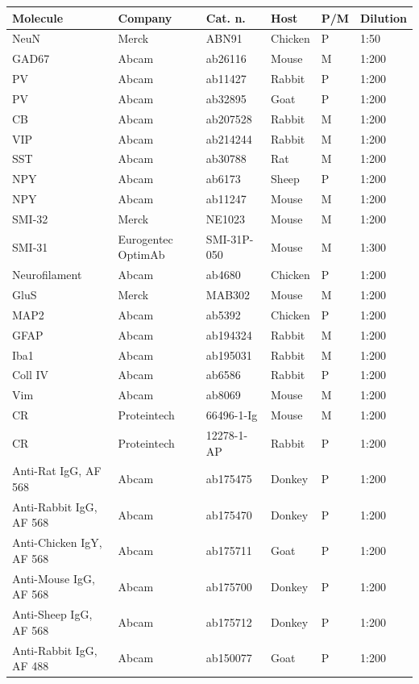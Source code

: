 \documentclass{article}
\begin{document}
\begin{center}\small\begin{longtable}{llllll}\toprule
\textbf{Molecule} & \textbf{Company} & \textbf{Cat. n.} & \textbf{Host} & \textbf{P/M} & \textbf{Dilution}\\\midrule
NeuN & Merck & ABN91 & Chicken & P & 1:50\\
GAD67 & Abcam & ab26116 & Mouse & M & 1:200\\
PV & Abcam & ab11427 & Rabbit & P & 1:200\\
PV & Abcam & ab32895 & Goat & P & 1:200\\
CB & Abcam & ab207528 & Rabbit & M & 1:200\\
VIP & Abcam & ab214244 & Rabbit & M & 1:200\\
SST & Abcam & ab30788 & Rat & M & 1:200\\
NPY & Abcam & ab6173 & Sheep & P & 1:200\\
NPY & Abcam & ab11247 & Mouse & M & 1:200\\
SMI-32 & Merck & NE1023 & Mouse & M & 1:200\\
SMI-31 & Eurogentec OptimAb & SMI-31P-050 & Mouse & M & 1:300\\
Neurofilament & Abcam & ab4680 & Chicken & P & 1:200\\
GluS & Merck & MAB302 & Mouse & M & 1:200\\
MAP2 & Abcam & ab5392 & Chicken & P & 1:200\\
GFAP & Abcam & ab194324 & Rabbit & M & 1:200\\
Iba1 & Abcam & ab195031 & Rabbit & M & 1:200\\
Coll IV & Abcam & ab6586 & Rabbit & P & 1:200\\
Vim & Abcam & ab8069 & Mouse & M & 1:200\\
CR & Proteintech & 66496-1-Ig & Mouse & M & 1:200\\
CR & Proteintech & 12278-1-AP & Rabbit & P & 1:200\\
Anti-Rat IgG, AF 568 & Abcam & ab175475 & Donkey & P & 1:200\\
Anti-Rabbit IgG, AF 568 & Abcam & ab175470 & Donkey & P & 1:200\\
Anti-Chicken IgY, AF 568 & Abcam & ab175711 & Goat & P & 1:200\\
Anti-Mouse IgG, AF 568 & Abcam & ab175700 & Donkey & P & 1:200\\
Anti-Sheep IgG, AF 568 & Abcam & ab175712 & Donkey & P & 1:200\\
Anti-Rabbit IgG, AF 488 & Abcam & ab150077 & Goat & P & 1:200\\

\end{longtable}
\end{center}
\end{document}
